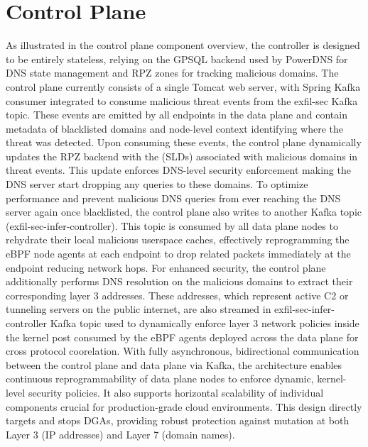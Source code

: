 \documentclass [11pt, proquest] {uwthesis}[2020/02/24]
\begin{document}
\section{Control Plane}
As illustrated in the control plane component overview, the controller is designed to be entirely stateless, relying on the GPSQL backend used by PowerDNS for DNS state management and RPZ zones for tracking malicious domains. The control plane currently consists of a single Tomcat web server, with Spring Kafka consumer integrated to consume malicious threat events from the exfil-sec Kafka topic. These events are emitted by all endpoints in the data plane and contain metadata of blacklisted domains and node-level context identifying where the threat was detected. Upon consuming these events, the control plane dynamically updates the RPZ backend with the (SLDs) associated with malicious domains in threat events. This update enforces DNS-level security enforcement making the DNS server start dropping any queries to these domains. To optimize performance and prevent malicious DNS queries from ever reaching the DNS server again once blacklisted, the control plane also writes to another Kafka topic (exfil-sec-infer-controller). This topic is consumed by all data plane nodes to rehydrate their local malicious userspace caches, effectively reprogramming the eBPF node agents at each endpoint to drop related packets immediately at the endpoint reducing network hops. For enhanced security, the control plane additionally performs DNS resolution on the malicious domains to extract their corresponding layer 3 addresses. These addresses, which  represent active C2 or tunneling servers on the public internet, are also streamed in exfil-sec-infer-controller Kafka topic used to dynamically enforce layer 3 network policies inside the kernel post consumed by the eBPF agents deployed across the data plane for cross protocol coorelation. With fully asynchronous, bidirectional communication between the control plane and data plane via Kafka, the architecture enables continuous reprogrammability of data plane nodes to enforce dynamic, kernel-level security policies. It also supports horizontal scalability of individual components crucial for production-grade cloud environments. This design directly targets and stops DGAs, providing robust protection against mutation at both Layer 3 (IP addresses) and Layer 7 (domain names).
\end{document}
